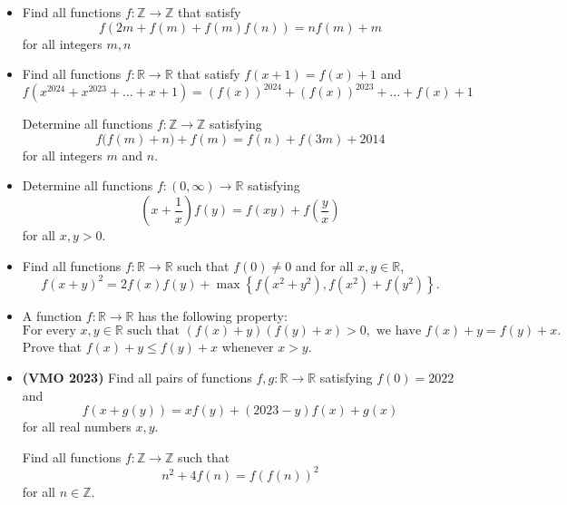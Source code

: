 \documentclass[11pt]{scrartcl}
\begin{document}
\begin{itemize}[label=, leftmargin=0em, itemsep=0.2em]
    \item \begin{btvn} Find all functions $f: \mathbb{Z} \to \mathbb{Z}$ that satisfy
        \[ f(2m+f(m)+f(m)f(n))=nf(m)+m \]
    for all integers $m,n$
    \end{btvn}
    \item \begin{btvn}
        Find all functions $f: \mathbb{R} \to \mathbb{R}$ that satisfy $f(x + 1) =f(x) + 1$ and
        \[
            f(x^{2024} + x^{2023} + \dots + x + 1) = (f(x))^{2024} + (f(x))^{2023} + \dots + f(x) + 1
        \]
    \end{btvn}
    \begin{btvn}
        Determine all functions $f: \mathbb{Z}\to\mathbb{Z}$ satisfying\[f\big(f(m)+n\big)+f(m)=f(n)+f(3m)+2014\]for all integers $m$ and $n$.
    \end{btvn}
    \item \begin{btvn}
        Determine all functions $f:(0,\infty)\to\mathbb{R}$ satisfying$$\left(x+\frac{1}{x}\right)f(y)=f(xy)+f\left(\frac{y}{x}\right)$$for all $x,y>0$.
    \end{btvn}
    \item \begin{btvn}
        Find all functions $f:\mathbb{R}\rightarrow\mathbb{R}$ such that $f(0)\neq 0$ and for all $x,y\in\mathbb{R}$,
\[ f(x+y)^2 = 2f(x)f(y) + \max \left\{ f(x^2+y^2), f(x^2)+f(y^2) \right\}. \]
    \end{btvn}
    \item \begin{btvn}
        A function $f:\mathbb{R} \to \mathbb{R}$ has the following property:
        $$\text{For every } x,y \in \mathbb{R} \text{ such that }(f(x)+y)(f(y)+x) > 0, \text{ we have } f(x)+y = f(y)+x.$$Prove that $f(x)+y \leq f(y)+x$ whenever $x>y$.
    \end{btvn}
    \item \begin{btvn}\textbf{(VMO 2023)} Find all pairs of functions \( f, g:\mathbb{R} \to \mathbb{R} \) satisfying \( f(0) = 2022 \) and
    \[ f(x+g(y)) = xf(y) + (2023-y)f(x) + g(x) \]
    for all real numbers \( x, y \).
\end{btvn}
\begin{btvn}
    Find all functions $f : \mathbb{Z} \to\mathbb{ Z}$ such that
\[ n^2+4f(n)=f(f(n))^2 \]
for all $n\in \mathbb{Z}$.


\end{btvn}
\end{itemize}
\end{document}
